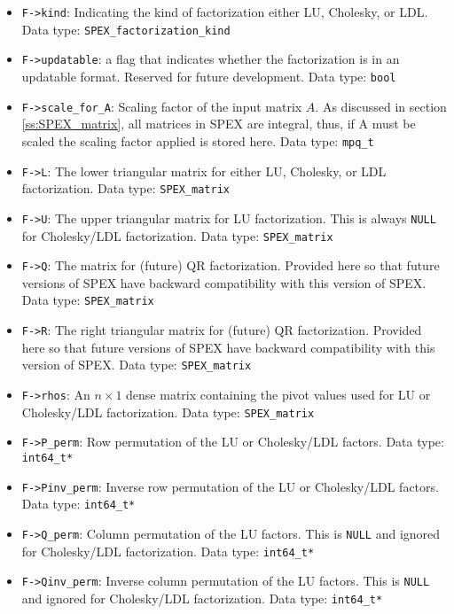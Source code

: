 \documentclass[12pt,oneside]{book}
\theoremstyle{definition}
\newcommand{\qr}[1]{\ifthenelse{\boolean{qr}}{\protect #1}{}}
\begin{document}
\begin{itemize}
\item \verb|F->kind|: Indicating the kind of factorization either LU, Cholesky, or LDL. Data type: \verb|SPEX_factorization_kind|

\item \verb|F->updatable|: a flag that indicates whether the factorization is in an updatable format. Reserved for future development. Data type: \verb|bool|

\item \verb|F->scale_for_A|: Scaling factor of the input matrix $A$. As discussed in section \ref{ss:SPEX_matrix}, all matrices in SPEX are integral, thus, if A must be scaled the scaling factor applied is stored here. Data type: \verb|mpq_t|

\item \verb|F->L|: The lower triangular matrix for either LU, Cholesky, or LDL factorization. Data type: \verb|SPEX_matrix|

\item \verb|F->U|: The upper triangular matrix for LU factorization. This is always \verb|NULL| for Cholesky/LDL factorization. Data type: \verb|SPEX_matrix|

\item \verb|F->Q|: The matrix for (future) QR factorization. Provided here so that future versions of SPEX have backward compatibility with this version of SPEX. Data type: \verb|SPEX_matrix|

\item \verb|F->R|: The right triangular matrix for (future) QR factorization. Provided here so that future versions of SPEX have backward compatibility with this version of SPEX. Data type: \verb|SPEX_matrix|

\item \verb|F->rhos|: An $n \times 1$ dense matrix containing the pivot values used for LU or Cholesky/LDL factorization. Data type: \verb|SPEX_matrix|

\item \verb|F->P_perm|: Row permutation of the LU or Cholesky/LDL factors. Data type: \verb|int64_t*|

\item \verb|F->Pinv_perm|: Inverse row permutation of the LU or Cholesky/LDL factors. Data type: \verb|int64_t*|

\item \verb|F->Q_perm|: Column permutation of the LU factors. This is \verb|NULL| and ignored for Cholesky/LDL factorization. Data type: \verb|int64_t*|

\item \verb|F->Qinv_perm|: Inverse column permutation of the LU factors. This is \verb|NULL| and ignored for Cholesky/LDL factorization. Data type: \verb|int64_t*|

\end{itemize}
\end{document}
